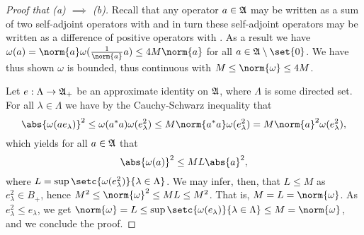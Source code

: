 \begin{proof}[Proof that (a) \(\implies\) (b)]
    Recall that any operator \(a \in \mathfrak{A}\) may be written as a sum of two self-adjoint operators with  and in turn these self-adjoint operators may be written as a difference of positive operators with . As a result we have \(\omega(a) = \norm{a} \omega(\frac1{\norm{a}}a) \leq 4M \norm{a}\) for all \(a \in \algebra{A} \setminus \set{0}\). We have thus shown \(\omega\) is bounded, thus continuous with \(M \leq \norm{\omega} \leq 4M\).

    Let \(e : \Lambda \to \mathfrak{A}_+\) be an approximate identity on \(\mathfrak{A}\), where \(\Lambda\) is some directed set. For all \(\lambda \in \Lambda\) we have by the Cauchy-Schwarz inequality that
    \begin{equation*}
        \abs{\omega(a e_\lambda)}^2 \leq \omega(a^*a) \omega(e_\lambda^2) \leq M \norm{a^*a} \omega(e_{\lambda}^2) = M \norm{a}^2\omega(e_\lambda^2),
    \end{equation*}
    which yields for all \(a \in \mathfrak{A}\) that
    \begin{equation*}
        \abs{\omega(a)}^2 \leq M L \abs{a}^2,
    \end{equation*}
    where \(L = \sup\setc{\omega(e_\lambda^2)}{\lambda \in \Lambda}\). We may infer, then, that \(L \leq M\) as \(e_{\lambda}^2 \in B_+\), hence \(M^2 \leq \norm{\omega}^2 \leq ML \leq M^2\). That is, \(M = L = \norm{\omega}\). As \(e_\lambda^2 \leq e_\lambda\), we get \(\norm{\omega} = L \leq \sup\setc{\omega(e_\lambda)}{\lambda \in \Lambda} \leq M = \norm{\omega}\), and we conclude the proof.
\end{proof}
